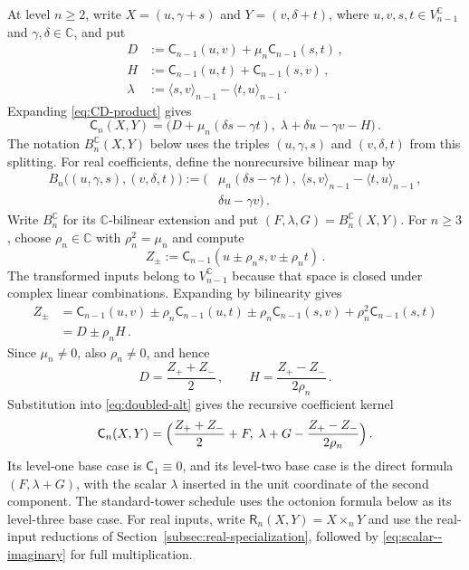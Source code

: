 \documentclass[11pt,reqno]{amsart}
\numberwithin{equation}{section}
\newcommand{\C}{\mathbb C}
\newcommand{\AltC}{\mathsf C}
\newcommand{\AltR}{\mathsf R}
\begin{document}
At level $n\ge2$, write $X=(u,\gamma+s)$ and $Y=(v,\delta+t)$, where
$u,v,s,t\in V_{n-1}^{\C}$ and $\gamma,\delta\in\C$, and put
\[
\begin{aligned}
D&:=\AltC_{n-1}(u,v)+\mu_n\AltC_{n-1}(s,t)\,,\\
H&:=\AltC_{n-1}(u,t)+\AltC_{n-1}(s,v)\,,\\
\lambda&:=\langle s,v\rangle_{n-1}-\langle t,u\rangle_{n-1}\,.
\end{aligned}
\]
Expanding \eqref{eq:CD-product} gives
\begin{equation}\label{eq:doubled-alt}
\AltC_n(X,Y)=\bigl(D+\mu_n(\delta s-\gamma t),\;
                    \lambda+\delta u-\gamma v-H\bigr)\,.
\end{equation}
The notation $B_n^{\C}(X,Y)$ below uses the triples
$(u,\gamma,s)$ and $(v,\delta,t)$ from this splitting. For real
coefficients, define the nonrecursive bilinear map by
\begin{equation}\label{eq:nonrecursive-map}
\begin{aligned}
B_n\bigl((u,\gamma,s),(v,\delta,t)\bigr)
:=\bigl(&\mu_n(\delta s-\gamma t),\;
\langle s,v\rangle_{n-1}-\langle t,u\rangle_{n-1}\,,\\
&\delta u-\gamma v\bigr)\,.
\end{aligned}
\end{equation}
Write $B_n^{\C}$ for its $\C$-bilinear extension and put
$(F,\lambda,G)=B_n^{\C}(X,Y)$. For $n\ge3$, choose
$\rho_n\in\C$ with $\rho_n^2=\mu_n$ and compute
\[
Z_\pm:=\AltC_{n-1}(u\pm\rho_n s,v\pm\rho_n t)\,.
\]
The transformed inputs belong to $V_{n-1}^{\C}$ because that space is
closed under complex linear combinations. Expanding by bilinearity gives
\[
\begin{aligned}
Z_\pm
&=\AltC_{n-1}(u,v)
 \pm\rho_n\AltC_{n-1}(u,t)
 \pm\rho_n\AltC_{n-1}(s,v)
 +\rho_n^2\AltC_{n-1}(s,t)\\
&=D\pm\rho_n H\,.
\end{aligned}
\]
Since $\mu_n\ne0$, also $\rho_n\ne0$, and hence
\[
D=\frac{Z_++Z_-}{2}\,,\qquad
H=\frac{Z_+-Z_-}{2\rho_n}\,.
\]
Substitution into \eqref{eq:doubled-alt} gives the recursive coefficient
kernel
\begin{equation}\label{eq:two-call-formula}
\AltC_n(X,Y)=\Bigl(\frac{Z_++Z_-}{2}+F,\;
                   \lambda+G-\frac{Z_+-Z_-}{2\rho_n}\Bigr)\,.
\end{equation}
Its level-one base case is
$\AltC_1\equiv0$, and its level-two base case is the direct formula
$(F,\lambda+G)$, with the scalar $\lambda$ inserted in the unit coordinate
of the second component. The standard-tower schedule uses the octonion formula
below
as its level-three base case. For real inputs,
write $\AltR_n(X,Y)=X\times_nY$ and use the real-input reductions of
Section~\ref{subsec:real-specialization}, followed by
\eqref{eq:scalar--imaginary} for full multiplication.
\end{document}
